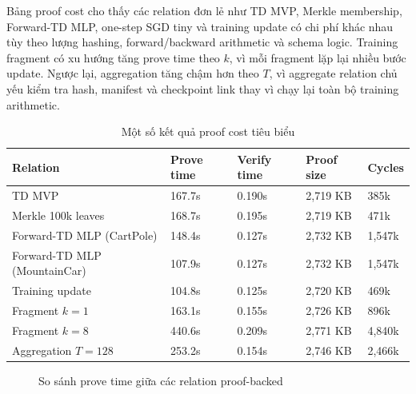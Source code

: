\documentclass[12pt,a4paper,oneside]{report}
\begin{document}
Bảng proof cost cho thấy các relation đơn lẻ như TD MVP, Merkle membership, Forward-TD MLP, one-step SGD tiny và training update có chi phí khác nhau tùy theo lượng hashing, forward/backward arithmetic và schema logic. Training fragment có xu hướng tăng prove time theo \(k\), vì mỗi fragment lặp lại nhiều bước update. Ngược lại, aggregation tăng chậm hơn theo \(T\), vì aggregate relation chủ yếu kiểm tra hash, manifest và checkpoint link thay vì chạy lại toàn bộ training arithmetic.

\begin{table}[H]
\centering
\caption{Một số kết quả proof cost tiêu biểu}
\scriptsize
\begin{tabularx}{\textwidth}{@{}p{} p{} p{} p{} p{}@{}}
\toprule
Relation & Prove time & Verify time & Proof size & Cycles \\
\midrule
TD MVP & 167.7s & 0.190s & 2,719 KB & 385k \\
Merkle 100k leaves & 168.7s & 0.195s & 2,719 KB & 471k \\
Forward-TD MLP (CartPole) & 148.4s & 0.127s & 2,732 KB & 1,547k \\
Forward-TD MLP (MountainCar) & 107.9s & 0.127s & 2,732 KB & 1,547k \\
Training update & 104.8s & 0.125s & 2,720 KB & 469k \\
Fragment \(k=1\) & 163.1s & 0.155s & 2,726 KB & 896k \\
Fragment \(k=8\) & 440.6s & 0.209s & 2,771 KB & 4,840k \\
Aggregation \(T=128\) & 253.2s & 0.154s & 2,746 KB & 2,466k \\
\bottomrule
\end{tabularx}
\end{table}

\begin{figure}[H]
\centering
{}
\caption{So sánh prove time giữa các relation proof-backed}
\end{figure}
\end{document}
